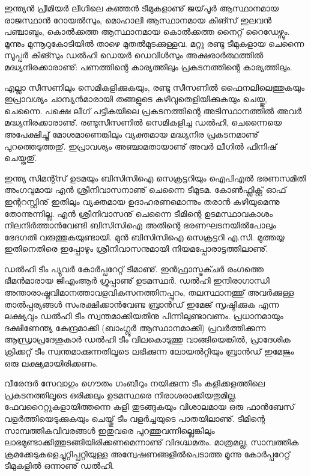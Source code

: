 ﻿
\vskip 2pt

ഇന്ത്യന്‍ പ്രീമിയര്‍ ലീഗിലെ കുഞ്ഞന്‍ ടീമുകളാണു് ജയ്‌പൂര്‍ ആസ്ഥാനമായ രാജസ്ഥാന്‍ റോയല്‍സും, മൊഹാലി 
ആസ്ഥാനമായ കിങ്സ് ഇലവന്‍ പഞ്ചാബും, കൊല്‍ക്കത്ത ആസ്ഥാനമായ കൊല്‍ക്കത്ത നൈറ്റ് റൈഡേഴ്സും. 
മൂന്നും മുന്നൂറുകോടിയില്‍ താഴെ മുതല്‍മുടക്കുള്ളവ. മറ്റു രണ്ടു ടീമുകളായ ചെന്നൈ സൂപ്പര്‍ കിങ്സും ഡല്‍ഹി ഡെയര്‍ 
ഡെവിള്‍സും അക്ഷരാര്‍ത്ഥത്തില്‍ മദ്ധ്യനിരക്കാരാണു്: പണത്തിന്റെ കാര്യത്തിലും പ്രകടനത്തിന്റെ കാര്യത്തിലും.

എല്ലാ സീസണിലും സെമികളിക്കുകയും, രണ്ടു സീസണില്‍ ഫൈനലിലെത്തുകയും ഇപ്രാവശ്യം ചാമ്പ്യന്‍മാരായി തങ്ങളുടെ 
കഴിവുതെളിയിക്കുകയും ചെയ്തു, ചെന്നൈ. പക്ഷെ ലീഗ് പട്ടികയിലെ പ്രകടനത്തിന്റെ അടിസ്ഥാനത്തില്‍ അവര്‍ 
മദ്ധ്യനിരക്കാരാണു്. രണ്ടുസീസണില്‍ സെമികളിച്ച ഡല്‍ഹി, ചെന്നൈയെ അപേക്ഷിച്ചു് മോശമാണെങ്കിലും വ്യക്തമായ 
മദ്ധ്യനിര പ്രകടനമാണു് പുറത്തെടുത്തതു്. ഇപ്രാവശ്യം അഞ്ചാമതായാണു് അവര്‍ ലീഗില്‍ ഫിനിഷ് ചെയ്തതു്.

ഇന്ത്യ സിമന്റ്സ് ഉടമയും ബിസിസിഐ സെക്രട്ടറിയും ഐപിഎല്‍ ഭരണസമിതി അംഗവുമായ എന്‍ ശ്രീനിവാസനാണു് 
ചെന്നൈ ടീമുടമ. കോണ്‍ഫ്ലിക്റ്റ് ഓഫ് ഇന്ററസ്റ്റിനു് ഇതിലും വ്യക്തമായ ഉദാഹരണമൊന്നും തരാന്‍ കഴിയുമെന്നു തോന്നുന്നില്ല.
എന്‍ ശ്രീനിവാസനു് ചെന്നൈ ടീമിന്റെ ഉടമസ്ഥാവകാശം നിലനിര്‍ത്താന്‍വേണ്ടി ബിസിസിഐ അതിന്റെ ഭരണഘടനയില്‍പോലും 
ഭേദഗതി വരുത്തുകയുണ്ടായി. മുന്‍ ബിസിസിഐ സെക്രട്ടറി എ.സി. മുത്തയ്യ ഇതിനെതിരെ ഇപ്പോഴും ശ്രീനിവാസനുമായി 
നിയമപ്പോരാട്ടത്തിലാണു്.

ഡല്‍ഹി ടീം പ്യുവര്‍ കോര്‍പ്പറേറ്റ് ടീമാണു്. ഇന്‍ഫ്രാസ്ട്രക്ചര്‍ രംഗത്തെ ഭീമന്‍മാരായ ജിഎംആര്‍ ഗ്രൂപ്പാണു് ഉടമസ്ഥര്‍. 
ഡല്‍ഹി ഇന്ദിരാഗാന്ധി അന്താരാഷ്ട്രവിമാനത്താവളവികസനത്തിനപ്പുറം, തലസ്ഥാനത്തു് അവര്‍ക്കുള്ള താല്‍പ്പര്യങ്ങള്‍ 
സംരക്ഷിക്കാന്‍വേണ്ട ബ്രാന്‍ഡ് ഇമേജ് സൃഷ്ടിക്കുക എന്ന ലക്ഷ്യവും ഡല്‍ഹി ടീം സ്വന്തമാക്കിയതിനു പിന്നിലുണ്ടാവണം. 
പ്രധാനമായും ദക്ഷിണേന്ത്യ കേന്ദ്രമാക്കി (ബാംഗ്ലൂര്‍ ആസ്ഥാനമാക്കി) പ്രവര്‍ത്തിക്കുന്ന ആന്ധ്രാപ്രദേശുകാര്‍ ഡല്‍ഹി ടീം വിലകൊടുത്തു
 വാങ്ങിയെങ്കില്‍, പ്രാദേശിക ക്രിക്കറ്റ് ടീം സ്വന്തമാക്കുന്നതിലൂടെ ലഭിക്കുന്ന ലോയല്‍റ്റിയും ബ്രാന്‍ഡ് ഇമേജും ഒരു 
ലക്ഷ്യമായിരിക്കണം.

വീരേന്ദര്‍ സേവാഗും ഗൌതം ഗംബീറും നയിക്കുന്ന ടീം കളിക്കളത്തിലെ പ്രകടനത്തിലൂടെ ഒരിക്കലും ഉടമസ്ഥരെ 
നിരാശരാക്കിയതുമില്ല. ഫേവറൈറ്റുകളായിത്തന്നെ കളി തുടങ്ങുകയും വിശാലമായ ഒരു ഫാന്‍ബേസ് വളര്‍ത്തിയെടുക്കുകയും 
ചെയ്തു് ടീം വളര്‍ച്ചയുടെ പാതയിലാണു്. ടീമിന്റെ സാമ്പത്തികവിവരങ്ങള്‍ ഇതുവരെ പുറത്തുവന്നില്ലെങ്കിലും 
ലാഭമുണ്ടാക്കിത്തുടങ്ങിയിരിക്കണമെന്നാണു് വിദഗ്ദ്ധമതം. മാത്രമല്ല, സാമ്പത്തിക ക്രമക്കേടുകളെച്ചുറ്റിപ്പറ്റിയുള്ള 
അന്വേഷണങ്ങളില്‍പെടാത്ത മൂന്നു കോര്‍പ്പറേറ്റ് ടീമുകളില്‍ ഒന്നാണു് ഡല്‍ഹി.


